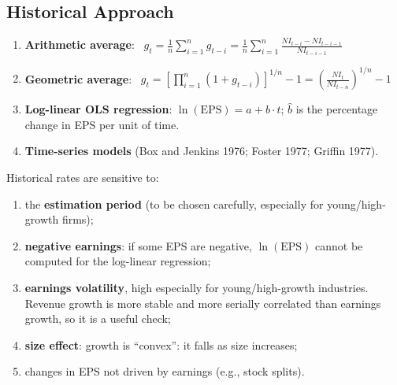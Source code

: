 \subsection{Historical Approach}
\begin{keybox}
\begin{enumerate}[leftmargin=*]
  \item \textbf{Arithmetic average}: \ $g_t=\frac1n\sum_{i=1}^{n}g_{t-i}=\frac1n\sum_{i=1}^{n}\frac{NI_{t-i}-NI_{t-i-1}}{NI_{t-i-1}}$
  \item \textbf{Geometric average}: \ $g_t=\left[\prod_{i=1}^{n}(1+g_{t-i})\right]^{1/n}-1=\left(\frac{NI_t}{NI_{t-n}}\right)^{1/n}-1$
  \item \textbf{Log-linear OLS regression}: $\ln(\text{EPS})=a+b\cdot t$; $\hat b$ is the percentage change in EPS per unit of time.
  \item \textbf{Time-series models} (Box and Jenkins 1976; Foster 1977; Griffin 1977).
\end{enumerate}
\end{keybox}
Historical rates are sensitive to:
\begin{enumerate}
  \item the \textbf{estimation period} (to be chosen carefully, especially for young/high-growth firms);
  \item \textbf{negative earnings}: if some EPS are negative, $\ln(\text{EPS})$ cannot be computed for the log-linear regression;
  \item \textbf{earnings volatility}, high especially for young/high-growth industries. Revenue growth is more stable and more serially correlated than earnings growth, so it is a useful check;
  \item \textbf{size effect}: growth is ``convex'': it falls as size increases;
  \item changes in EPS not driven by earnings (e.g., stock splits).
\end{enumerate}

